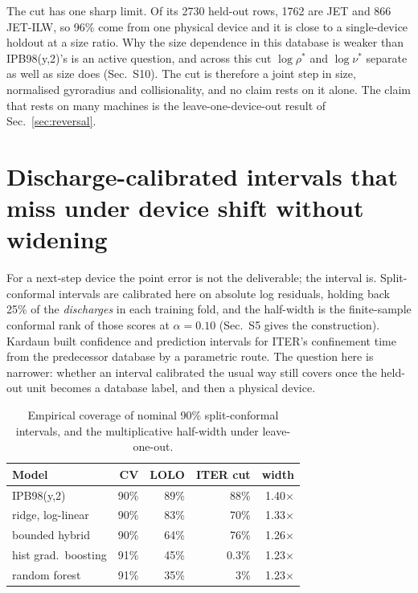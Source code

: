 \documentclass[aip,pop,preprint,amsmath,amssymb]{revtex4-2}
\begin{document}
The cut has one sharp limit. Of its 2730 held-out rows, 1762 are JET and 866
JET-ILW, so 96\% come from one physical device and it is close to a
single-device holdout at a size ratio. Why the size dependence in this database
is weaker than IPB98(y,2)'s is an active question\cite{hall,hall26}, and across
this cut $\log\rho^{*}$ and $\log\nu^{*}$ separate as well as size does
(Sec.~S10). The cut is therefore a joint step in size, normalised gyroradius and
collisionality, and no claim rests on it alone. The claim that rests on many
machines is the leave-one-device-out result of Sec.~\ref{sec:reversal}.

\section{Discharge-calibrated intervals that miss under device shift without widening}
\label{sec:conformal}

For a next-step device the point error is not the deliverable; the interval is.
Split-conformal intervals\cite{conformal} are calibrated here on absolute log
residuals, holding back 25\% of the \emph{discharges} in each training fold,
and the half-width is the finite-sample conformal rank of those scores at
$\alpha=0.10$ (Sec.~S5 gives the construction). Kardaun\cite{kardaun} built
confidence and prediction intervals for ITER's confinement time from the
predecessor database by a parametric route. The question here is narrower:
whether an interval calibrated the usual way still covers once the held-out
unit becomes a database label, and then a physical device.

\begin{table}[t]
\caption{Empirical coverage of nominal 90\% split-conformal intervals, and the
multiplicative half-width under leave-one-out.}
\label{tab:coverage}
\begin{ruledtabular}
\begin{tabular}{lrrrr}
Model & CV & LOLO & ITER cut & width \\
\hline
IPB98(y,2) & 90\% & 89\% & 88\% & 1.40$\times$ \\
ridge, log-linear & 90\% & 83\% & 70\% & 1.33$\times$ \\
bounded hybrid & 90\% & 64\% & 76\% & 1.26$\times$ \\
hist grad.\ boosting & 91\% & 45\% & 0.3\% & 1.23$\times$ \\
random forest & 91\% & 35\% & 3\% & 1.23$\times$ \\
\end{tabular}
\end{ruledtabular}
\end{table}
\end{document}
